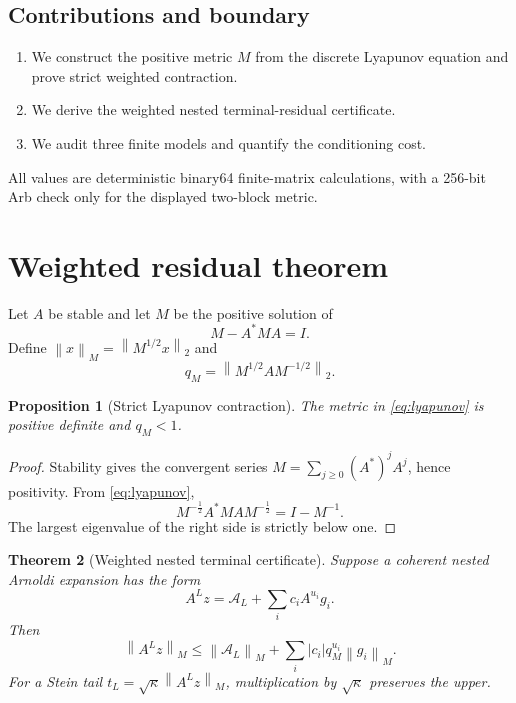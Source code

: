 \documentclass[11pt]{article}
\newtheorem{theorem}{Theorem}[section]
\newtheorem{proposition}[theorem]{Proposition}
\newcommand{\norm}[1]{\left\lVert#1\right\rVert}
\begin{document}
\subsection*{Contributions and boundary}

\begin{enumerate}[leftmargin=2.2em]
 \item We construct the positive metric $M$ from the discrete Lyapunov
       equation and prove strict weighted contraction.
 \item We derive the weighted nested terminal-residual certificate.
 \item We audit three finite models and quantify the conditioning cost.
\end{enumerate}

All values are deterministic binary64 finite-matrix calculations, with a
256-bit Arb check only for the displayed two-block metric.

\section{Weighted residual theorem}
\label{sec:theorem}

Let $A$ be stable and let $M$ be the positive solution of
\begin{equation}
 M-A^*MA=I.
\label{eq:lyapunov}
\end{equation}
Define $\norm{x}_M=\norm{M^{1/2}x}_2$ and
\begin{equation}
 q_M=\norm{M^{1/2}AM^{-1/2}}_2.
\label{eq:qmetric}
\end{equation}

\begin{proposition}[Strict Lyapunov contraction]
\label{prop:contraction}
The metric in \eqref{eq:lyapunov} is positive definite and
$q_M<1$.
\end{proposition}

\begin{proof}
Stability gives the convergent series
$M=\sum_{j\ge0}(A^*)^jA^j$, hence positivity.  From
\eqref{eq:lyapunov},
\[
 M^{-\frac12}A^*MA M^{-\frac12}
 =I-M^{-1}.
\]
The largest eigenvalue of the right side is strictly below one.
\end{proof}

\begin{theorem}[Weighted nested terminal certificate]
\label{thm:weighted}
Suppose a coherent nested Arnoldi expansion has the form
\[
 A^Lz=\mathcal A_L+\sum_i c_i A^{u_i}g_i.
\]
Then
\begin{equation}
 \norm{A^Lz}_M
 \le \norm{\mathcal A_L}_M+
 \sum_i |c_i|q_M^{u_i}\norm{g_i}_M.
\label{eq:weighted-upper}
\end{equation}
For a Stein tail $t_L=\sqrt{\kappa}\norm{A^Lz}_M$, multiplication by
$\sqrt{\kappa}$ preserves the upper.
\end{theorem}
\end{document}
